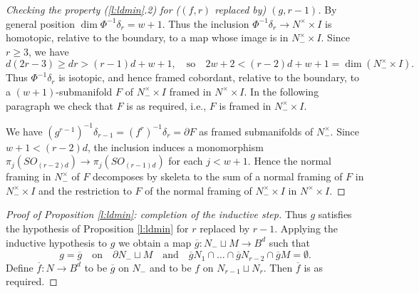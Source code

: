 \documentclass[12pt]{article}
\def\diag{\delta}
\theoremstyle{plain}
\theoremstyle{definition}
\begin{document}
\begin{proof}[Checking the property (\ref{l:ldmin}.2) for ($(f,r)$ replaced by) $(g,r-1)$]
By general position $\dim \Phi^{-1}\diag_r=w+1$.
Thus the inclusion $\Phi^{-1}\diag_r\to N^\times\times I$ is homotopic, relative to the boundary, to a map whose image is in $N^\times_-\times I$.
Since $r\ge3$, we have
$$d(2r-3)\ge dr>(r-1)d+w+1,\quad\text{so}\quad 2w+2<(r-2)d+w+1=\dim(N^\times_-\times I).$$
Thus $\Phi^{-1}\diag_r$ is isotopic, and hence framed cobordant, relative to the boundary, to a $(w+1)$-submanifold $F$ of $N^\times_-\times I$ framed in $N^\times\times I$.
In the following paragraph we check that $F$ is as required, i.e., $F$ is framed in $N^\times_-\times I$.


We have $(g^{r-1})^{-1}\diag_{r-1}=(f^r)^{-1}\diag_r=\partial F$ as framed submanifolds of $N^\times_-$.
Since $w+1<(r-2)d$,
the inclusion induces a monomorphism $\pi_j(SO_{(r-2)d})\to\pi_j(SO_{(r-1)d})$ for each $j<w+1$.
Hence the normal framing in $N^\times_-$ of $F$ decomposes by skeleta to the sum of a normal framing of $F$ in $N^\times_-\times I$
and the restriction to $F$ of the normal framing of $N^\times_-\times I$ in $N^\times\times I$.
\end{proof}



\begin{proof}[Proof of Proposition \ref{l:ldmin}: completion of the inductive step]
Thus $g$ satisfies the hypothesis of Proposition \ref{l:ldmin} for $r$ replaced by $r-1$.
Applying the inductive hypothesis to $g$ we obtain a map $\overline g:N_-\sqcup M\to B^d$ such that
$$g=\overline g\quad\text{on}\quad \partial N_-\sqcup M
\quad\text{and}\quad \overline gN_1\cap\ldots\cap \overline gN_{r-2}\cap \overline gM=\emptyset.$$
Define $\overline f:N\to B^d$ to be $\overline g$ on $N_-$ and to be $f$ on $N_{r-1}\sqcup N_r$.
Then $\overline f$ is as required.
\end{proof}
\end{document}
